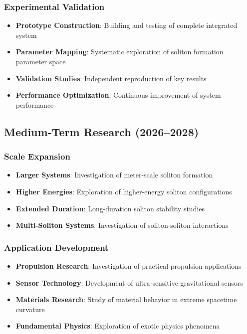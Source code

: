 \documentclass[12pt,a4paper]{article}
\begin{document}
\subsubsection{Experimental Validation}
\begin{itemize}
\item \textbf{Prototype Construction}: Building and testing of complete integrated system
\item \textbf{Parameter Mapping}: Systematic exploration of soliton formation parameter space
\item \textbf{Validation Studies}: Independent reproduction of key results
\item \textbf{Performance Optimization}: Continuous improvement of system performance
\end{itemize}

\subsection{Medium-Term Research (2026--2028)}

\subsubsection{Scale Expansion}
\begin{itemize}
\item \textbf{Larger Systems}: Investigation of meter-scale soliton formation
\item \textbf{Higher Energies}: Exploration of higher-energy soliton configurations
\item \textbf{Extended Duration}: Long-duration soliton stability studies
\item \textbf{Multi-Soliton Systems}: Investigation of soliton-soliton interactions
\end{itemize}

\subsubsection{Application Development}
\begin{itemize}
\item \textbf{Propulsion Research}: Investigation of practical propulsion applications
\item \textbf{Sensor Technology}: Development of ultra-sensitive gravitational sensors
\item \textbf{Materials Research}: Study of material behavior in extreme spacetime curvature
\item \textbf{Fundamental Physics}: Exploration of exotic physics phenomena
\end{itemize}
\end{document}
